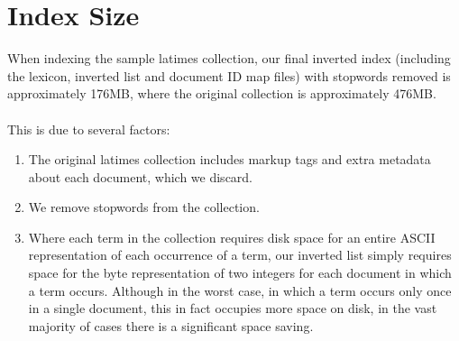 
\section{Index Size}
\label{sec:indexsize}

When indexing the sample latimes collection, our final inverted index (including the lexicon, inverted list and document ID map files) with stopwords removed is approximately 176MB, where the original collection is approximately 476MB.

\paragraph{}
This is due to several factors:

\begin{enumerate}
	\item The original latimes collection includes markup tags and extra metadata about each document, which we discard.
	\item We remove stopwords from the collection.
	\item Where each term in the collection requires disk space for an entire ASCII representation of each occurrence of a term, our inverted list simply requires space for the byte representation of two integers for each document in which a term occurs. Although in the worst case, in which a term occurs only once in a single document, this in fact occupies more space on disk, in the vast majority of cases there is a significant space saving.
\end{enumerate}

